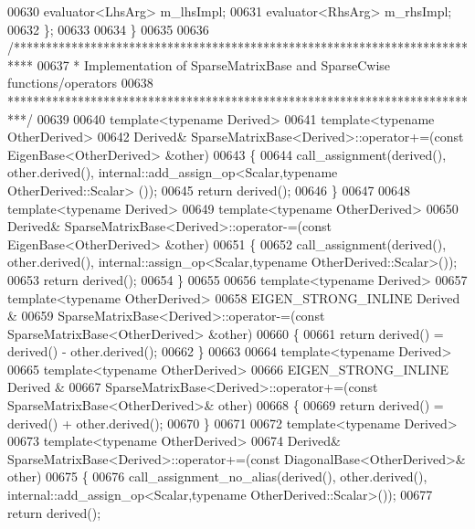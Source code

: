 \begin{DoxyCode}
00630   evaluator<LhsArg> m\_lhsImpl;
00631   evaluator<RhsArg> m\_rhsImpl;
00632 \};
00633 
00634 \}
00635 
00636 \textcolor{comment}{/***************************************************************************}
00637 \textcolor{comment}{* Implementation of SparseMatrixBase and SparseCwise functions/operators}
00638 \textcolor{comment}{***************************************************************************/}
00639 
00640 \textcolor{keyword}{template}<\textcolor{keyword}{typename} Derived>
00641 \textcolor{keyword}{template}<\textcolor{keyword}{typename} OtherDerived>
00642 Derived& SparseMatrixBase<Derived>::operator+=(\textcolor{keyword}{const} EigenBase<OtherDerived> &other)
00643 \{
00644   call\_assignment(derived(), other.derived(), internal::add\_assign\_op<Scalar,typename OtherDerived::Scalar>
      ());
00645   \textcolor{keywordflow}{return} derived();
00646 \}
00647 
00648 \textcolor{keyword}{template}<\textcolor{keyword}{typename} Derived>
00649 \textcolor{keyword}{template}<\textcolor{keyword}{typename} OtherDerived>
00650 Derived& SparseMatrixBase<Derived>::operator-=(\textcolor{keyword}{const} EigenBase<OtherDerived> &other)
00651 \{
00652   call\_assignment(derived(), other.derived(), internal::assign\_op<Scalar,typename OtherDerived::Scalar>());
00653   \textcolor{keywordflow}{return} derived();
00654 \}
00655 
00656 \textcolor{keyword}{template}<\textcolor{keyword}{typename} Derived>
00657 \textcolor{keyword}{template}<\textcolor{keyword}{typename} OtherDerived>
00658 EIGEN\_STRONG\_INLINE Derived &
00659 SparseMatrixBase<Derived>::operator-=(\textcolor{keyword}{const} SparseMatrixBase<OtherDerived> &other)
00660 \{
00661   \textcolor{keywordflow}{return} derived() = derived() - other.derived();
00662 \}
00663 
00664 \textcolor{keyword}{template}<\textcolor{keyword}{typename} Derived>
00665 \textcolor{keyword}{template}<\textcolor{keyword}{typename} OtherDerived>
00666 EIGEN\_STRONG\_INLINE Derived &
00667 SparseMatrixBase<Derived>::operator+=(\textcolor{keyword}{const} SparseMatrixBase<OtherDerived>& other)
00668 \{
00669   \textcolor{keywordflow}{return} derived() = derived() + other.derived();
00670 \}
00671 
00672 \textcolor{keyword}{template}<\textcolor{keyword}{typename} Derived>
00673 \textcolor{keyword}{template}<\textcolor{keyword}{typename} OtherDerived>
00674 Derived& SparseMatrixBase<Derived>::operator+=(\textcolor{keyword}{const} DiagonalBase<OtherDerived>& other)
00675 \{
00676   call\_assignment\_no\_alias(derived(), other.derived(), internal::add\_assign\_op<Scalar,typename
       OtherDerived::Scalar>());
00677   \textcolor{keywordflow}{return} derived();

\end{DoxyCode}

